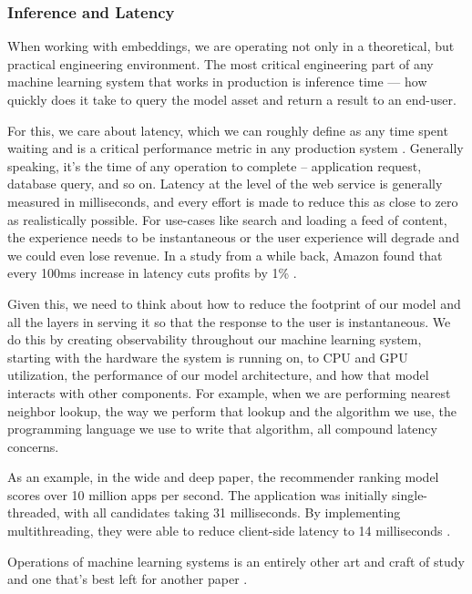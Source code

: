 \documentclass[11pt, table]{diazessay} %
\begin{document}
\begin{sloppypar}
\subsubsection{Inference and Latency}

When working with embeddings, we are operating not only in a theoretical, but practical engineering environment. The most critical engineering part of any machine learning system that works in production is inference time --- how quickly does it take to query the model asset and return a result to an end-user.

For this, we care about latency, which we can roughly define as any time spent waiting and is a critical performance metric in any production system \citep{gregg2014systems}. Generally speaking, it's the time of any operation to complete -- application request, database query, and so on. Latency at the level of the web service is generally measured in milliseconds, and every effort is made to reduce this as close to zero as realistically possible. For use-cases like search and loading a feed of content, the experience needs to be instantaneous or the user experience will degrade and we could even lose revenue. In a study from a while back, Amazon found that every 100ms increase in latency cuts profits by 1\%  \citep{flach2013reducing}.

Given this, we need to think about how to reduce the footprint of our model and all the layers in serving it so that the response to the user is instantaneous. We do this by creating observability throughout our machine learning system, starting with the hardware the system is running on, to CPU and GPU utilization, the performance of our model architecture, and how that model interacts with other components. For example, when we are performing nearest neighbor lookup, the way we perform that lookup and the algorithm we use, the programming language we use to write that algorithm, all compound latency concerns.  

As an example, in the wide and deep paper, the recommender ranking model scores over 10 million apps per second. The application was initially single-threaded, with all candidates taking 31 milliseconds. By implementing multithreading, they were able to reduce client-side latency to 14 milliseconds \citep{cheng2016wide}.

Operations of machine learning systems is an entirely other art and craft of study and one that's best left for another paper \citep{kreuzberger2022machine}.


\end{sloppypar}
\end{document}
